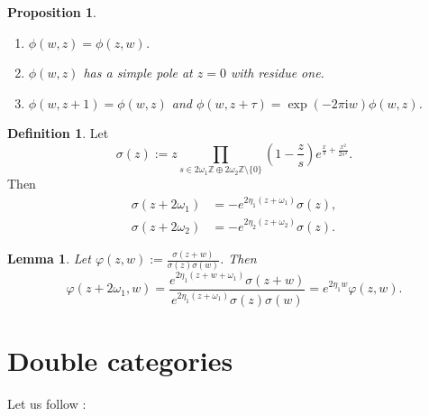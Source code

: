 \documentclass[11pt]{report}
\newtheorem{lemma}[theorem]{Lemma}
\newtheorem{prop}[theorem]{Proposition}
\theoremstyle{definition}
\newtheorem{definition}[theorem]{Definition}
\theoremstyle{remark}
\theoremstyle{remark}
\newcommand{\Z}{\mathbb{Z}}
\newcommand{\I}{\mathrm{i}}
\begin{document}
\begin{prop}
\begin{enumerate}[label=(\roman*)]
\item $\phi(w,z) = \phi(z,w)$.
\item $\phi(w,z)$ has a simple pole at $z=0$ with residue one.
\item $\phi(w,z+1) = \phi(w,z)$ and $\phi(w,z+\tau) = \exp(-2\pi\I w) \phi(w,z)$.
\end{enumerate}
\end{prop}

\begin{definition}
Let
\begin{equation*}
\sigma(z) := z \prod_{s \in 2\omega_1 \Z \oplus 2\omega_2\Z \setminus \{ 0 \}} \left(1-\frac{z}{s}\right) e^{\frac{x}{s}+\frac{x^2}{2s^2}}.
\end{equation*}
Then
\begin{align*}
\sigma(z+2\omega_1) &= -e^{2\eta_1(z+\omega_1)} \sigma(z), \\
\sigma(z+2\omega_2) &= -e^{2\eta_2(z+\omega_2)} \sigma(z).
\end{align*}
\end{definition}

\begin{lemma}
Let $\varphi(z,w) := \frac{\sigma(z+w)}{\sigma(z)\sigma(w)}$. Then
\begin{equation*}
\varphi(z+2\omega_1,w) = \frac{e^{2\eta_1(z+w+\omega_1)}\sigma(z+w)}{e^{2\eta_1(z+\omega_1)}\sigma(z)\sigma(w)} = e^{2\eta_1 w} \varphi(z,w).
\end{equation*}
\end{lemma}

\chapter{Double categories}\label{appendix:doubleCats}

Let us follow \cite{article:hansen:2019}:
\end{document}
